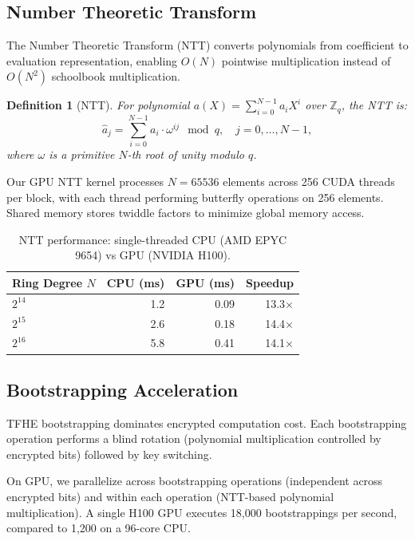 \documentclass[11pt]{article}
\newtheorem{definition}{Definition}
\begin{document}
\subsection{Number Theoretic Transform}

The Number Theoretic Transform (NTT) converts polynomials from coefficient to
evaluation representation, enabling $O(N)$ pointwise multiplication instead of
$O(N^2)$ schoolbook multiplication.

\begin{definition}[NTT]
For polynomial $a(X) = \sum_{i=0}^{N-1} a_i X^i$ over $\mathbb{Z}_q$, the NTT
is:
\begin{equation}
\hat{a}_j = \sum_{i=0}^{N-1} a_i \cdot \omega^{ij} \mod q,
\quad j = 0, \ldots, N-1,
\end{equation}
where $\omega$ is a primitive $N$-th root of unity modulo $q$.
\end{definition}

Our GPU NTT kernel processes $N = 65536$ elements across 256 CUDA threads per
block, with each thread performing butterfly operations on 256 elements. Shared
memory stores twiddle factors to minimize global memory access.

\begin{table}[H]
\centering
\small
\begin{tabular}{lrrr}
\toprule
\textbf{Ring Degree $N$} & \textbf{CPU (ms)} & \textbf{GPU (ms)} & \textbf{Speedup} \\
\midrule
$2^{14}$ & 1.2 & 0.09 & 13.3$\times$ \\
$2^{15}$ & 2.6 & 0.18 & 14.4$\times$ \\
$2^{16}$ & 5.8 & 0.41 & 14.1$\times$ \\
\bottomrule
\end{tabular}
\caption{NTT performance: single-threaded CPU (AMD EPYC 9654) vs GPU (NVIDIA H100).}
\label{tab:ntt}
\end{table}

\subsection{Bootstrapping Acceleration}

TFHE bootstrapping dominates encrypted computation cost. Each bootstrapping
operation performs a blind rotation (polynomial multiplication controlled by
encrypted bits) followed by key switching.

On GPU, we parallelize across bootstrapping operations (independent across
encrypted bits) and within each operation (NTT-based polynomial multiplication).
A single H100 GPU executes 18,000 bootstrappings per second, compared to 1,200
on a 96-core CPU.
\end{document}
